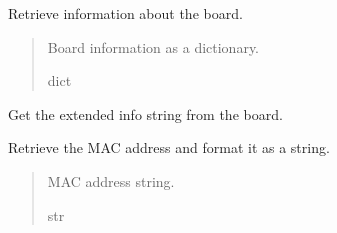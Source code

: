 \documentclass[letterpaper,10pt,english]{sphinxmanual}
\begin{document}
\begin{fulllineitems}
\begin{fulllineitems}
\end{fulllineitems}


\begin{fulllineitems}
\label{\detokenize{apidocs:management.MANAGEMENT.get_board_info}}
\pysigstartsignatures
{}
\pysigstopsignatures
\sphinxAtStartPar
Retrieve information about the board.
\begin{quote}\begin{description}
\sphinxAtStartPar
Board information as a dictionary.

\sphinxAtStartPar
dict

\end{description}\end{quote}

\end{fulllineitems}


\begin{fulllineitems}
\label{\detokenize{apidocs:management.MANAGEMENT.get_extended_info}}
\pysigstartsignatures
{}
\pysigstopsignatures
\sphinxAtStartPar
Get the extended info string from the board.

\end{fulllineitems}


\begin{fulllineitems}
\label{\detokenize{apidocs:management.MANAGEMENT.get_mac}}
\pysigstartsignatures
{}
\pysigstopsignatures
\sphinxAtStartPar
Retrieve the MAC address and format it as a string.
\begin{quote}\begin{description}
\sphinxAtStartPar
MAC address string.

\sphinxAtStartPar
str


\end{description}
\end{quote}
\end{fulllineitems}
\end{fulllineitems}
\end{document}
